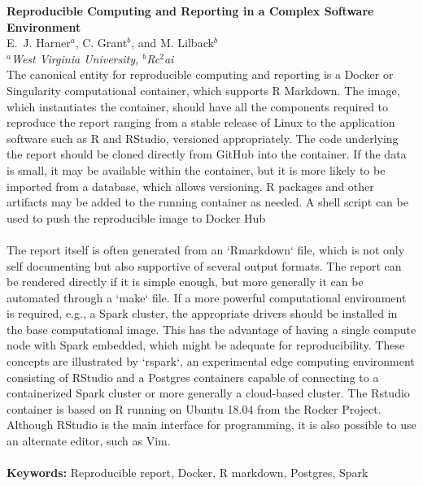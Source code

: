 
\setlength{\textwidth}{160mm}\setlength{\textheight}{240mm}
\setlength{\oddsidemargin}{0mm}\setlength{\evensidemargin}{0mm}
\setlength{\topmargin}{-10mm}
\setlength{\parindent}{0mm} 
\pagestyle{empty}	%



{\Large\bf Reproducible Computing and Reporting in a Complex Software Environment}\\[4mm]

E.~J. Harner$^a$, C. Grant$^b$, and  M. Lilback$^b$\\ 				

{\small \em $^a$West Virginia University, $^b$Rc$^2$ai}\\[3mm]

The canonical entity for reproducible computing and reporting is a Docker or Singularity computational container, which supports R Markdown. The image, which instantiates the container, should have all the components required to reproduce the report ranging from a stable release of Linux to the application software such as R and RStudio, versioned appropriately. The code underlying the report should be cloned directly from GitHub into the container. If the data is small,  it may be available within the container, but it is more likely to be imported from a database, which allows versioning. R packages and other artifacts may be added to the running container as needed. A shell script can be used to push the reproducible image to Docker Hub\\
\\
The report itself is often generated from an `Rmarkdown` file, which is not only self documenting but also supportive of several output formats. The report can be rendered directly if it is simple enough, but more generally it can be automated through a `make` file. If a more powerful computational environment is required, e.g., a Spark cluster, the appropriate drivers should be installed in the base computational image. This has the advantage of having a single compute node with Spark embedded, which might be adequate for reproducibility. These concepts are illustrated by `rspark`, an experimental edge computing environment consisting of RStudio and a Postgres containers capable of connecting to a containerized Spark cluster or more generally a cloud-based cluster. The Rstudio container is based on R running on Ubuntu 18.04 from the Rocker Project. Although RStudio is the main interface for programming, it is also possible to use an alternate editor, such as Vim.\\
\\
\textbf{Keywords:} Reproducible report, Docker, R markdown, Postgres, Spark


